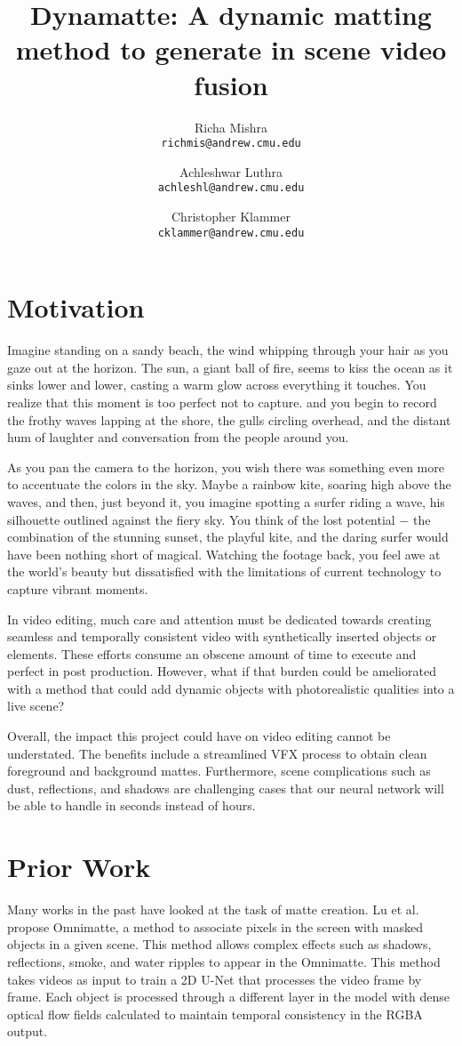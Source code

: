 \documentclass{article}
\title{Dynamatte: A dynamic matting method to generate in scene video fusion}
\author{Richa Mishra \\
\small\texttt{richmis@andrew.cmu.edu}
\and
Achleshwar Luthra \\
\small\texttt{achleshl@andrew.cmu.edu}
\and
Christopher Klammer \\
\small\texttt{cklammer@andrew.cmu.edu}}
\begin{document}
\maketitle

\section{Motivation}

Imagine standing on a sandy beach, the wind whipping through your hair as you gaze out at the horizon. The sun, a giant ball of fire, seems to kiss the ocean as it sinks lower and lower, casting a warm glow across everything it touches. You realize that this moment is too perfect not to capture. and you begin to record the frothy waves lapping at the shore, the gulls circling overhead, and the distant hum of laughter and conversation from the people around you.

As you pan the camera to the horizon, you wish there was something even more to accentuate the colors in the sky. Maybe a rainbow kite, soaring high above the waves, and then, just beyond it, you imagine spotting a surfer riding a wave, his silhouette outlined against the fiery sky. You think of the lost potential $-$ the combination of the stunning sunset, the playful kite, and the daring surfer would have been nothing short of magical. Watching the footage back, you feel awe at the world's beauty but dissatisfied with the limitations of current technology to capture vibrant moments.

In video editing, much care and attention must be dedicated towards creating seamless and temporally consistent video with synthetically inserted objects or elements. These efforts consume an obscene amount of time to execute and perfect in post production. However, what if that burden could be ameliorated with a method that could add dynamic objects with photorealistic qualities into a live scene? 

Overall, the impact this project could have on video editing cannot be understated. The benefits include a streamlined VFX process to obtain clean foreground and background mattes. Furthermore, scene complications such as dust, reflections, and shadows are challenging cases that our neural network will be able to handle in seconds instead of hours.

\section{Prior Work}
Many works in the past have looked at the task of matte creation. Lu et al.\cite{lu2021} propose Omnimatte, a method to associate pixels in the screen with masked objects in a given scene. This method allows complex effects such as shadows, reflections, smoke, and water ripples to appear in the Omnimatte. This method takes videos as input to train a 2D U-Net that processes the video frame by frame. Each object is processed through a different layer in the model with dense optical flow fields calculated to maintain temporal consistency in the RGBA output. 
\end{document}
